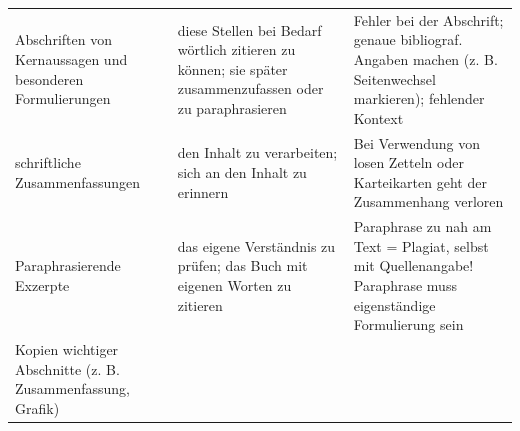 \documentclass[]{book}
\theoremstyle{definition}
\theoremstyle{definition}
\theoremstyle{definition}
\theoremstyle{remark}
\begin{document}
\begin{longtable}[]{@{}lll@{}}
\begin{minipage}[t]{0.31\columnwidth}
Abschriften von Kernaussagen und besonderen Formulierungen\strut
\end{minipage} & \begin{minipage}[t]{0.27\columnwidth}\raggedright\strut
diese Stellen bei Bedarf wörtlich zitieren zu können; sie später
zusammenzufassen oder zu paraphrasieren \vspace{5mm}\strut
\end{minipage} & \begin{minipage}[t]{0.33\columnwidth}\raggedright\strut
Fehler bei der Abschrift; genaue bibliograf. Angaben machen (z. B.
Seitenwechsel markieren); fehlender Kontext \vspace{5mm}\strut
\end{minipage}\tabularnewline
\begin{minipage}[t]{0.31\columnwidth}\raggedright\strut
schriftliche Zusammenfassungen\strut
\end{minipage} & \begin{minipage}[t]{0.27\columnwidth}\raggedright\strut
den Inhalt zu verarbeiten; sich an den Inhalt zu erinnern
\vspace{5mm}\strut
\end{minipage} & \begin{minipage}[t]{0.33\columnwidth}\raggedright\strut
Bei Verwendung von losen Zetteln oder Karteikarten geht der Zusammenhang
verloren \vspace{5mm}\strut
\end{minipage}\tabularnewline
\begin{minipage}[t]{0.31\columnwidth}\raggedright\strut
Paraphrasierende Exzerpte\strut
\end{minipage} & \begin{minipage}[t]{0.27\columnwidth}\raggedright\strut
das eigene Verständnis zu prüfen; das Buch mit eigenen Worten zu
zitieren \vspace{5mm}\strut
\end{minipage} & \begin{minipage}[t]{0.33\columnwidth}\raggedright\strut
Paraphrase zu nah am Text = Plagiat, selbst mit Quellenangabe!
Paraphrase muss eigenständige Formulierung sein \vspace{5mm}\strut
\end{minipage}\tabularnewline
\begin{minipage}[t]{0.31\columnwidth}\raggedright\strut
Kopien wichtiger Abschnitte (z. B. Zusammenfassung, Grafik)\strut
\end{minipage} & \begin{minipage}[t]{0.27\columnwidth}\raggedright\strut

\end{minipage}
\end{longtable}
\end{document}
